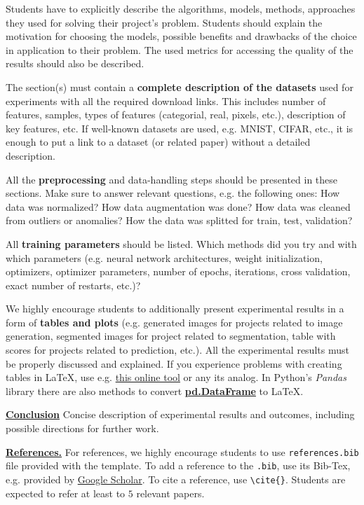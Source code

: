 \documentclass{article}
\begin{document}
Students have to explicitly describe the algorithms, models, methods, approaches they used for solving their project's problem. Students should explain the motivation for choosing the models, possible benefits and drawbacks of the choice in application to their problem. The used metrics for accessing the quality of the results should also be described.

The section(s) must contain a \textbf{complete description of the datasets} used for experiments with all the required download links. This includes number of features, samples, types of features (categorial, real, pixels, etc.), description of key features, etc. If well-known datasets are used, e.g. MNIST, CIFAR, etc., it is enough to put a link to a dataset (or related paper) without a detailed description.

All the \textbf{preprocessing} and data-handling steps should be presented in these sections. Make sure to answer relevant questions, e.g. the following ones: How data was normalized? How data augmentation was done? How data was cleaned from outliers or anomalies? How the data was splitted for train, test, validation?

All \textbf{training parameters} should be listed. Which methods did you try and with which parameters (e.g. neural network architectures, weight initialization, optimizers, optimizer parameters, number of epochs, iterations, cross validation, exact number of restarts, etc.)?

We highly encourage students to additionally present experimental results in a form of \textbf{tables and plots} (e.g. generated images for projects related to image generation, segmented images for project related to segmentation, table with scores for projects related to prediction, etc.). All the experimental results must be properly discussed and explained. If you experience problems with creating tables in \LaTeX, use e.g. \href{https://www.tablesgenerator.com}{this online tool} or any its analog. In Python's \textit{Pandas} library there are also methods to convert \href{https://pandas.pydata.org/pandas-docs/stable/reference/api/pandas.DataFrame.to_latex.html}{\textbf{pd.DataFrame}} to \LaTeX  .

\underline{\textbf{Conclusion}} Concise description of experimental results and outcomes, including possible directions for further work.

\underline{\textbf{References.}} For references, we highly encourage students to use \texttt{references.bib} file provided with the template. To add a reference to the \texttt{.bib}, use its Bib-Tex, e.g.  provided by \href{scholar.google.com}{Google Scholar}. To cite a reference, use \texttt{\textbackslash cite\{\}}. Students are expected to refer at least to $5$ relevant papers.
\end{document}
